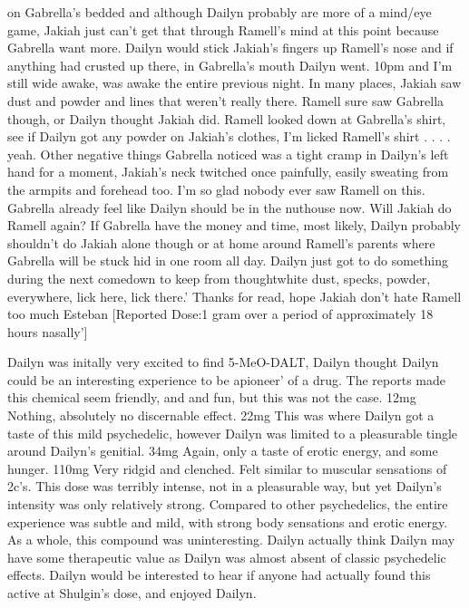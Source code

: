 \documentclass[12pt]{book}
\begin{document}
on Gabrella's bedded and although Dailyn probably are more of a mind/eye game, Jakiah just can't get that through Ramell's mind at this point because Gabrella want more. Dailyn would stick Jakiah's fingers up Ramell's nose and if anything had crusted up there, in Gabrella's mouth Dailyn went. 10pm and I'm still wide awake, was awake the entire previous night. In many places, Jakiah saw dust and powder and lines that weren't really there. Ramell sure saw Gabrella though, or Dailyn thought Jakiah did. Ramell looked down at Gabrella's shirt, see if Dailyn got any powder on Jakiah's clothes, I'm licked Ramell's shirt . . .  . yeah. Other negative things Gabrella noticed was a tight cramp in Dailyn's left hand for a moment, Jakiah's neck twitched once painfully, easily sweating from the armpits and forehead too. I'm so glad nobody ever saw Ramell on this. Gabrella already feel like Dailyn should be in the nuthouse now. Will Jakiah do Ramell again? If Gabrella have the money and time, most likely, Dailyn probably shouldn't do Jakiah alone though or at home around Ramell's parents where Gabrella will be stuck hid in one room all day. Dailyn just got to do something during the next comedown to keep from thoughtwhite dust, specks, powder, everywhere, lick here, lick there.' Thanks for read, hope Jakiah don't hate Ramell too much Esteban [Reported Dose:1 gram over a period of approximately 18 hours nasally']



Dailyn was initally very excited to find 5-MeO-DALT, Dailyn thought Dailyn could be an interesting experience to be apioneer' of a drug. The reports made this chemical seem friendly, and and fun, but this was not the case. 12mg Nothing, absolutely no discernable effect. 22mg This was where Dailyn got a taste of this mild psychedelic, however Dailyn was limited to a pleasurable tingle around Dailyn's genitial. 34mg Again, only a taste of erotic energy, and some hunger. 110mg Very ridgid and clenched. Felt similar to muscular sensations of 2c's. This dose was terribly intense, not in a pleasurable way, but yet Dailyn's intensity was only relatively strong. Compared to other psychedelics, the entire experience was subtle and mild, with strong body sensations and erotic energy. As a whole, this compound was uninteresting. Dailyn actually think Dailyn may have some therapeutic value as Dailyn was almost absent of classic psychedelic effects. Dailyn would be interested to hear if anyone had actually found this active at Shulgin's dose, and enjoyed Dailyn.
\end{document}
